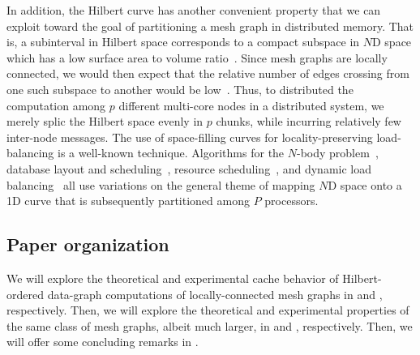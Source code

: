 In addition, the Hilbert curve has another convenient property
that we can exploit toward the goal of partitioning a mesh graph
in distributed memory.  That is, a subinterval in Hilbert space
corresponds to a compact subspace in $N$D space which has a
low surface area to volume ratio~\cite{SinghHoHe93,WarrenSa93,PilkingtonBa96}.  
Since mesh graphs are locally connected, we would then expect 
that the relative number of edges crossing
from one such subspace to another would be low~\cite{MoonJaFa96}.  Thus, to
distributed the computation among $p$ different multi-core
nodes in a distributed system, we merely splic the Hilbert space
evenly in $p$ chunks, while incurring relatively few inter-node
messages.  The use of space-filling curves for locality-preserving 
load-balancing is a well-known technique.  Algorithms 
for the $N$-body problem~\cite{SinghHoHe93,WarrenSa93},
database layout and scheduling~\cite{MoonJaFa96}, 
resource scheduling~\cite{LeungPhJo02}, and dynamic load 
balancing~\cite{HarlacherKlRo12} all use variations on the general
theme of mapping $N$D space onto a 1D curve that is 
subsequently partitioned among $P$ processors.


\subsection{Paper organization}

We will explore the theoretical and experimental 
cache behavior of Hilbert-ordered 
data-graph computations of locally-connected mesh graphs in
 and , respectively.
Then, we will explore the theoretical and experimental
properties of the same class of mesh graphs, albeit much larger,
in  and , respectively.
Then, we will offer some concluding remarks in .


